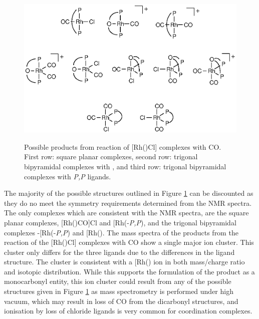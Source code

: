\begin{figure}[htb]
\begin{center}
\vspace{0.5cm}
\includegraphics{../Figures/RhCOpossibilities.eps}
\caption[Possible products from reaction of \texorpdfstring{[Rh(\tBuxantphosk)Cl{]} complexes with CO} R]{Possible products from reaction of \texorpdfstring{[Rh(\tBuxantphosk)Cl] complexes with CO} R.  First row: square planar complexes, second row: trigonal bipyramidal complexes with \POP{} \tBuxantphos{}, and third row: trigonal bipyramidal complexes with \dento{}\emph{P,P}\textprime{} \tBuxantphos{} ligands.}
\vspace{0.2cm}
\label{RhCOpossibilities}
\end{center}
\end{figure}
\vspace{0.2cm}

The majority of the possible structures outlined in Figure \ref{RhCOpossibilities} can be discounted as they do no meet the symmetry requirements determined from the NMR spectra.  The only complexes which are consistent with the NMR spectra, are the square planar complexes, [Rh(\tBuxantphosk)CO]Cl and [Rh(\tBuxantphos-\dento{}\emph{P,P}\textprime)\ce{(CO)2]Cl}, and the trigonal bipyramidal complexes \trans-[Rh(\tBuxantphos-\dento{}\emph{P,P}\textprime)\ce{(CO)2Cl]} and [Rh(\tBuxantphosk)\ce{(CO)2]+}.  The mass spectra of the products from the reaction of the [Rh(\tBuxantphos)Cl] complexes with CO show a single major ion cluster.  This cluster only differs for the three ligands due to the differences in the ligand structure.  The cluster is consistent with a [Rh(\tBuxantphos)\ce{(CO)]+} ion in both mass/charge ratio and isotopic distribution.  While this supports the formulation of the product as a monocarbonyl entity, this ion cluster could result from any of the possible structures given in Figure \ref{RhCOpossibilities} as mass spectrometry is performed under high vacuum, which may result in loss of CO from the dicarbonyl structures, and ionisation by loss of chloride ligands is very common for coordination complexes.\cite{Henderson1998}

